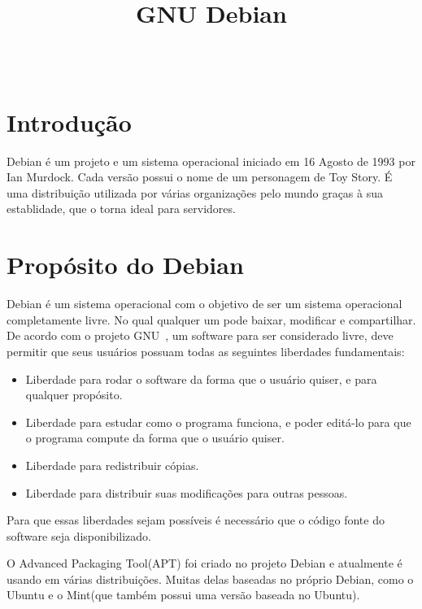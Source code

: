\documentclass[conference]{IEEEtran}
\title{GNU Debian}
\author{
\IEEEauthorblockN{Francisco Anderson Bezerra Rodrigues, Marcelo Bulhões Fonseca, Vitor Silva De Deus} \\
\IEEEauthorblockA{Departamento de Ciência da Computação, \\ Universidade de Brasília\\
}
}
\begin{document}
 

\maketitle
{}  




\section{Introdução}\label{sec:intro}
Debian é um projeto e um sistema operacional iniciado em 16 Agosto de 1993 por Ian Murdock\cite{DebianHistory}. Cada versão possui o nome de um personagem de Toy Story. É uma distribuição utilizada por várias organizações pelo mundo\cite{DebianUsers} graças à sua establidade, que o torna ideal para servidores.

\section{Propósito do Debian}\label{sec:prop}
Debian é um sistema operacional com o objetivo de ser um sistema operacional completamente livre. No qual qualquer um pode baixar, modificar e compartilhar. De acordo com o projeto GNU~\cite{FreeSoftware}, um software para ser considerado livre, deve permitir que seus usuários possuam todas as seguintes liberdades fundamentais:
\begin{itemize}
	\item Liberdade para rodar o software da forma que o usuário quiser, e para qualquer propósito.
	\item Liberdade para estudar como o programa funciona, e poder editá-lo para que o programa compute da forma que o usuário quiser.
	\item Liberdade para redistribuir cópias.
	\item Liberdade para distribuir suas modificações para outras pessoas.
\end{itemize}
Para que essas liberdades sejam possíveis é necessário que o código fonte do software seja disponibilizado.

O Advanced Packaging Tool(APT) foi criado no projeto Debian e atualmente é usando em várias distribuições. Muitas delas baseadas no próprio Debian, como o Ubuntu e o Mint(que também possui uma versão baseada no Ubuntu).
\end{document}
